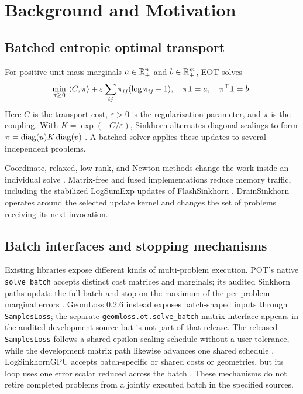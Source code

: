 \section{Background and Motivation}
\label{sec:setting-related}

\subsection{Batched entropic optimal transport}

For positive unit-mass marginals $a\in\mathbb{R}_+^n$ and $b\in\mathbb{R}_+^m$, EOT solves
\begin{equation}
\min_{\pi\geq0}\ \langle C,\pi\rangle
+\varepsilon\sum_{ij}\pi_{ij}(\log\pi_{ij}-1),\quad
\pi\mathbf{1}=a,\quad\pi^\top\mathbf{1}=b.
\label{eq:eot}
\end{equation}
Here $C$ is the transport cost, $\varepsilon>0$ is the regularization parameter, and $\pi$ is the coupling. With $K=\exp(-C/\varepsilon)$, Sinkhorn alternates diagonal scalings to form $\pi=\operatorname{diag}(u)K\operatorname{diag}(v)$ \citep{cuturi2013sinkhorn}. A batched solver applies these updates to several independent problems.

Coordinate, relaxed, low-rank, and Newton methods change the work inside an individual solve \citep{altschuler2017near,thibault2017overrelaxed,scetbon2021lowrank,kemertas2025truncated}. Matrix-free and fused implementations reduce memory traffic, including the stabilized LogSumExp updates of FlashSinkhorn \citep{ye2026flashsinkhorn}. DrainSinkhorn operates around the selected update kernel and changes the set of problems receiving its next invocation.

\subsection{Batch interfaces and stopping mechanisms}

Existing libraries expose different kinds of multi-problem execution. POT's native \texttt{solve\_batch} accepts distinct cost matrices and marginals; its audited Sinkhorn paths update the full batch and stop on the maximum of the per-problem marginal errors \citep{pot2026batchsource}. GeomLoss 0.2.6 instead exposes batch-shaped inputs through \texttt{SamplesLoss}; the separate \texttt{geomloss.ot.solve\_batch} matrix interface appears in the audited development source but is not part of that release. The released \texttt{SamplesLoss} follows a shared epsilon-scaling schedule without a user tolerance, while the development matrix path likewise advances one shared schedule \citep{feydy2019sinkhorn,geomloss2026batch}. LogSinkhornGPU accepts batch-specific or shared costs or geometries, but its loop uses one error scalar reduced across the batch \citep{logsinkhorngpu2024}. These mechanisms do not retire completed problems from a jointly executed batch in the specified sources.

